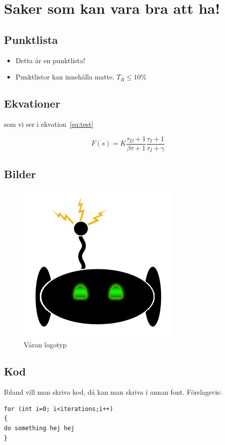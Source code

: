 \documentclass[a4paper,12pt,fleqn]{article}
\begin{document}
	
\tableofcontents
\thispagestyle{fancy}
\newpage

\section{Saker som kan vara bra att ha!}

\subsection{Punktlista}
\begin{itemize}
  \item Detta är en punktlista! 
  \item Punktlistor kan innehålla matte. $T_R \leq 10\%$
\end{itemize}

\subsection{Ekvationer}

som vi ser i ekvation~\ref{eq:test} %

\begin{equation}
F(s)= K\frac{\tau_D+1}{\beta\tau+1}\frac{\tau_I+1}{\tau_I+\gamma}	
	\label{eq:test} %
\end{equation} 

\subsection{Bilder}


\begin{figure}[htp] %
  \begin{center}
  \includegraphics[keepaspectratio=true,scale=0.8]{logotyp}  %
  \end{center}
  \caption{Våran logotyp} %
\end{figure}

\subsection{Kod}
Ibland vill man skriva kod, då kan man skriva i annan font. Förslagsvis:
\\ %

\begin{lstlisting}
for (int i=0; i<iterations;i++)
{
do something hej hej
}
\end{lstlisting}
\end{document}

